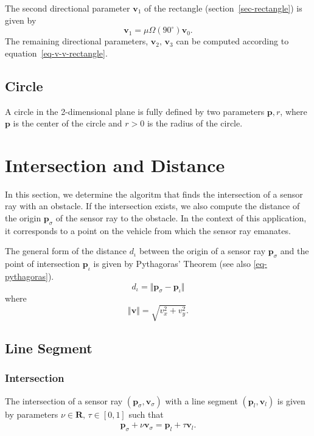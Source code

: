 \documentclass[11pt]{article}
\newcommand{\diota}{d_\iota}
\newcommand{\pb}{\mathbf{p}}
\newcommand{\pbl}{\mathbf{p}_l}
\newcommand{\pbiot}{\mathbf{p}_\iota}
\newcommand{\pbsig}{\mathbf{p}_\sigma}
\newcommand{\Rb}{\mathbf{R}}
\newcommand{\vb}{\mathbf{v}}
\newcommand{\vbl}{\mathbf{v}_l}
\newcommand{\vbsig}{\mathbf{v}_\sigma}
\begin{document}
The second directional parameter $\vb_1$ of the rectangle (section~\ref{sec-rectangle}) is given
by
\begin{equation}
    \vb_1 = \mu\Omega(90^\circ)\vb_0.\label{eq-vb1-rectangle}
\end{equation}
The remaining directional parameters, $\vb_2,\,\vb_3$ can be computed according
to equation~\eqref{eq-v-v-rectangle}.

\subsection{Circle}

A circle in the 2-dimensional plane is fully defined by two parameters
$\pb, r$, where $\pb$ is the center of the circle and $r>0$ is the
radius of the circle.


\section{Intersection and Distance}
\label{sec-intersection-distance}

In this section, we determine the algoritm that finds the intersection of a
sensor ray  with an obstacle. If the intersection
exists, we also compute the distance of the origin $\pbsig$ of the
sensor ray to the obstacle. In the context of this application, it
corresponds to a point on the vehicle from which the sensor ray emanates.

The general form of the distance $\diota$ between the origin of a sensor ray
$\pbsig$ and the point of intersection $\pbiot$ is given by
Pythagoras' Theorem (see also \eqref{eq-pythagoras}).
\begin{equation}
    \diota = \Vert\pbsig-\pbiot\Vert
\end{equation}
where
\begin{equation}
    \Vert\vb\Vert = \sqrt{v_{x}^2 + v_{y}^2}.\label{eq-pythagoras}
\end{equation}

\subsection{Line Segment}
\label{sec-intersection-line-segment}

\subsubsection*{Intersection}

The intersection of a sensor ray $(\pbsig,\vbsig)$ with a line segment
$(\pbl,\vbl)$ is given by parameters $\nu\in\Rb,\,\tau\in[0,1]$ such that
\begin{eqnarray}
    \pbsig + \nu \vbsig = \pbl + \tau \vbl. \label{eq-intersection-segment}
\end{eqnarray}
\end{document}

